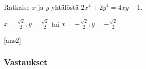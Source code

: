\begin{tehtava} %
    Ratkaise $x$ ja $y$ yhtälöstä $2x^4+2y^4=4xy-1$. %
    \begin{vastaus}
        $x=\frac{\sqrt{2}}{2}, y=\frac{\sqrt{2}}{2}$ tai $x=-\frac{\sqrt{2}}{2}, y=-\frac{\sqrt{2}}{2}$
    \end{vastaus}
\end{tehtava}

[ans2]

\subsubsection*{Vastaukset}

